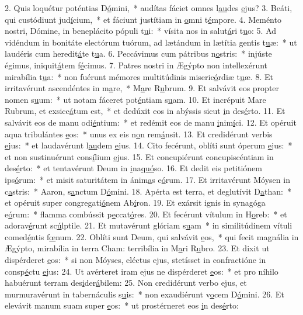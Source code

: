 2. Quis loquétur poténtias D\uline{ó}mini,~* audítas fáciet omnes l\uline{au}des \uline{e}jus?
3. Beáti, qui custódiunt jud\uline{í}cium,~* et fáciunt justítiam in \uline{o}mni t\uline{é}mpore.
4. Meménto nostri, Dómine, in beneplácito pópuli t\uline{u}i:~* vísita nos in salut\uline{á}ri t\uline{u}o:
5. Ad vidéndum in bonitáte electórum tuórum, ad lætándum in lætítia gentis t\uline{u}æ:~* ut laudéris cum heredit\uline{á}te t\uline{u}a.
6. Peccávimus cum pátribus n\uline{o}stris:~* injúste égimus, iniquit\uline{á}tem f\uline{é}cimus.
7. Patres nostri in Ægýpto non intellexérunt mirabília t\uline{u}a:~* non fuérunt mémores multitúdinis miseric\uline{ó}rdiæ t\uline{u}æ.
8. Et irritavérunt ascendéntes in m\uline{a}re,~* M\uline{a}re R\uline{u}brum.
9. Et salvávit eos propter nomen s\uline{u}um:~* ut notam fáceret pot\uline{é}ntiam s\uline{u}am.
10. Et incrépuit Mare Rubrum, et exsicc\uline{á}tum est,~* et dedúxit eos in abýssis sicut \uline{i}n des\uline{é}rto.
11. Et salvávit eos de manu odi\uline{é}ntium:~* et redémit eos de manu \uline{i}nim\uline{í}ci.
12. Et opéruit aqua tribulántes \uline{e}os:~* unus ex eis n\uline{o}n rem\uline{á}nsit.
13. Et credidérunt verbis \uline{e}jus:~* et laudavérunt l\uline{au}dem \uline{e}jus.
14. Cito fecérunt, oblíti sunt óperum \uline{e}jus:~* et non sustinuérunt cons\uline{í}lium \uline{e}jus.
15. Et concupiérunt concupiscéntiam in des\uline{é}rto:~* et tentavérunt Deum in \uline{i}na\uline{quó}so.
16. Et dedit eis petitiónem ips\uline{ó}rum:~* et misit saturitátem in ánim\uline{a}s e\uline{ó}rum.
17. Et irritavérunt Móysen in c\uline{a}stris:~* Aaron, s\uline{a}nctum D\uline{ó}mini.
18. Apérta est terra, et deglutívit D\uline{a}than:~* et opéruit super congregati\uline{ó}nem Ab\uline{í}ron.
19. Et exársit ignis in synagóga e\uline{ó}rum:~* flamma combússit p\uline{e}ccat\uline{ó}res.
20. Et fecérunt vítulum in H\uline{o}reb:~* et adorav\uline{é}runt sc\uline{ú}lptile.
21. Et mutavérunt glóriam s\uline{u}am~* in similitúdinem vítuli comed\uline{é}ntis f\uline{œ}num.
22. Oblíti sunt Deum, qui salvávit \uline{e}os,~* qui fecit magnália in Ægýpto, mirabília in terra Cham: terribília in M\uline{a}ri R\uline{u}bro.
23. Et dixit ut dispérderet \uline{e}os:~* si non Móyses, eléctus ejus, stetísset in confractióne in consp\uline{é}ctu \uline{e}jus:
24. Ut avérteret iram ejus ne dispérderet \uline{e}os:~* et pro níhilo habuérunt terram des\uline{i}der\uline{á}bilem:
25. Non credidérunt verbo ejus, et murmuravérunt in tabernáculis s\uline{u}is:~* non exaudiérunt v\uline{o}cem D\uline{ó}mini.
26. Et elevávit manum suam super \uline{e}os:~* ut prostérneret eos \uline{i}n des\uline{é}rto:
